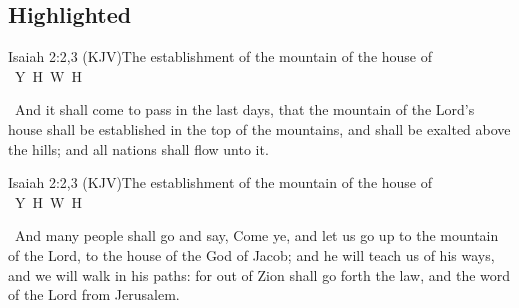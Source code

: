 \documentclass[12pt,aspectratio=169]{beamer}
\newcommand{\YA}{%
    \mbox{%
        Y\makebox[0pt][l]{\hspace{-0.178em}\raisebox{-0.00ex}{\scalebox{0.30}{E}}}%
        H\makebox[0pt][l]{\hspace{-0.010em}\raisebox{-0.00ex}{\scalebox{0.30}{O}}}%
        W\makebox[0pt][l]{\hspace{-0.245em}\raisebox{-0.00ex}{\scalebox{0.30}{A}}}%
        H%
    }%
}
\newcommand{\ver}[1]{%
    \raisebox{0.50ex}{%
        \scalebox{1.1}{%
            \pmb{\textbf{\textcolor{BSpbg}{#1}}}%
        }%
    }%
}
\newcommand{\QUOTE}[1]{%
    \par\noindent\hspace*{0.1\linewidth}%
    \begin{minipage}{0.8\linewidth}%
        \linespread{1.50}\large{#1}%
    \end{minipage}%
}
\newcommand{\RED}[1]{{\textcolor{TXred}{#1}}}
\newcommand{\YEL}[1]{{\textcolor{TXyel}{#1}}}
\newcommand{\GRE}[1]{{\textcolor{TXgre}{#1}}}
\newcommand{\CYA}[1]{{\textcolor{TXcya}{#1}}}
\newcommand{\BLU}[1]{{\textcolor{TXblu}{#1}}}
\newcommand{\MAG}[1]{{\textcolor{TXmag}{#1}}}
\begin{document}
    \subsection{Highlighted}

    \begin{frame}{Isaiah 2:2,3 (KJV)}{The establishment of the mountain of the house of \YA}
        \QUOTE{%
            \ver{2}~And \RED{it shall come to pass} in the last days, that the  mountain
            of the Lord's house shall  be  \YEL{established}  in  the  \CYA{top  of  the
            mountains}, and  shall  be  \CYA{exalted}  above  the  hills;  and  \GRE{all
            nations} shall flow unto it.
        }
    \end{frame}

    \begin{frame}{Isaiah 2:2,3 (KJV)}{The establishment of the mountain of the house of \YA}
        \QUOTE{%
            \ver{3}~And \GRE{many people} shall go and say, Come ye, and let us  \CYA{go
            up} to the mountain of the Lord, to the house of the \BLU{God of Jacob}; and
            he will \MAG{teach} us of his ways, and we will \MAG{walk} in his paths: for
            \YEL{out of Zion} shall go forth the \YEL{law,} and the  word  of  the  Lord
            \YEL{from Jerusalem}.
        }
    \end{frame}

\end{document}
